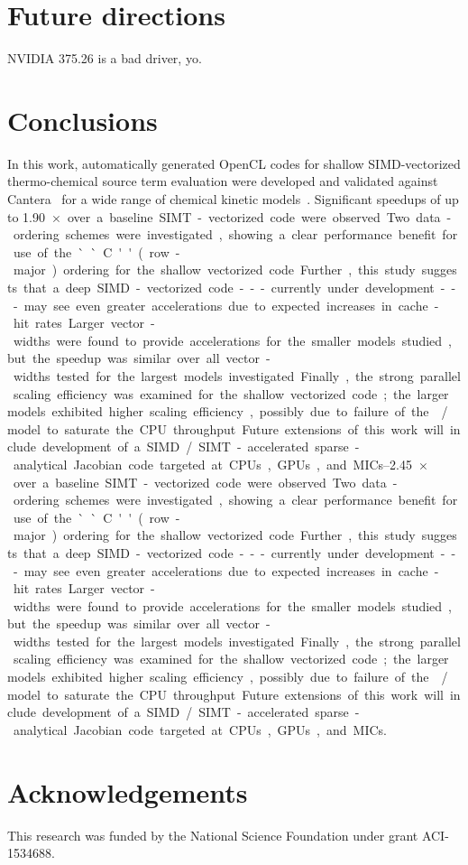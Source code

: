 \documentclass[12pt,number,sort&compress,preprint]{elsarticle}
\begin{document}
\section{Future directions}
\label{s:future}
NVIDIA 375.26 is a bad driver, yo.

\section{Conclusions}
In this work, automatically generated OpenCL codes for shallow SIMD-vectorized thermo-chemical source term evaluation were developed and validated against Cantera~\cite{Cantera} for a wide range of chemical kinetic models~\cite{Burke:2011fh,smith_gri-mech_30,Wang:2007,Sarathy:2013jr}.
Significant speedups of up to \SIrange{1.90}{2.45}{$\times$} over a baseline SIMT-vectorized code were observed.
Two data-ordering schemes were investigated, showing a clear performance benefit for use of the ``C'' (row-major) ordering for the shallow vectorized code.
Further, this study suggests that a deep SIMD-vectorized code---currently under development---may see even greater accelerations due to expected increases in cache-hit rates.
Larger vector-widths were found to provide accelerations for the smaller models studied, but the speedup was similar over all vector-widths tested for the largest models investigated.
Finally, the strong parallel scaling efficiency was examined for the shallow vectorized code; the larger models exhibited higher scaling efficiency, possibly due to failure of the \slash{} model to saturate the CPU throughput.
Future extensions of this work will include development of a SIMD\slash SIMT-accelerated sparse-analytical Jacobian code targeted at CPUs, GPUs, and MICs.

\section{Acknowledgements}
This research was funded by the National Science Foundation under grant ACI-1534688.


\end{document}

